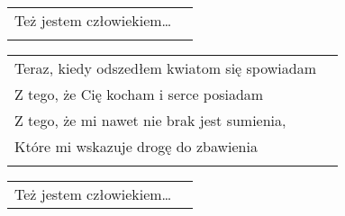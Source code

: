 \documentclass[a5paper]{article}
\begin{document}
\noindent
\begin{tabular}{@{}p{7.50cm}p{3cm}@{}}
Też jestem człowiekiem… \\  \\
\end{tabular}

\noindent
\begin{tabular}{@{}p{7.50cm}p{3cm}@{}}
Teraz, kiedy odszedłem kwiatom się spowiadam \\
Z tego, że Cię kocham i serce posiadam\\
Z tego, że mi nawet nie brak jest sumienia,\\
Które mi wskazuje drogę do zbawienia\\\\
\end{tabular}

\noindent
\begin{tabular}{@{}p{7.50cm}p{3cm}@{}}
Też jestem człowiekiem…
\end{tabular}
\end{document}
